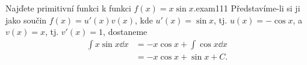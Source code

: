 \begin{mathexam}{Najďete primitivní funkci k funkci \(f(x) = x\sin x\).}{exam111}
  Představíme-li si ji jako součin \(f(x) = u'(x)v(x)\), kde \(u'(x) = \sin x\), tj. \(u(x) = -\cos
  x\), a \(v(x)= x\), tj. \(v'(x) = 1\), dostaneme
  \begin{align*}
    \int x\sin x\dd{x} &= -x\cos x + \int\cos x\dd{x} \\
                       &= -x\cos x + \sin x + C.
  \end{align*}    
\end{mathexam}